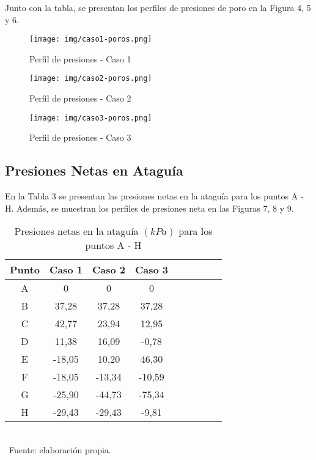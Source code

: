 \documentclass{article} %
\begin{document}
Junto con la tabla, se presentan los perfiles de presiones de poro en la Figura 4, 5 y 6.

\begin{figure}[h!]
    \centering
    \begin{minipage}{0.5\textwidth}
        \centering
        \texttt{[image: img/caso1-poros.png]}
        \caption{Perfil de presiones - Caso 1}
        \label{fig:imagen4}
    \end{minipage}\hfill
    \begin{minipage}{0.5\textwidth}
        \centering
        \texttt{[image: img/caso2-poros.png]}
        \caption{Perfil de presiones - Caso 2}
        \label{fig:imagen5}
    \end{minipage}\hfill
\end{figure}

\begin{figure}[h!]
    \centering
    \begin{minipage}{0.5\textwidth}
        \centering
        \texttt{[image: img/caso3-poros.png]}
        \caption{Perfil de presiones - Caso 3}
        \label{fig:imagen6}
    \end{minipage}
\end{figure}

\vspace{2cm}

\subsection{Presiones Netas en Ataguía}

En la Tabla 3 se presentan las presiones netas en la ataguía para los puntos A - H. Además, se muestran los perfiles de presiones neta en las Figuras 7, 8 y 9.

\begin{table}[h!]
    \centering
    \caption{Presiones netas en la ataguía $(kPa)$ para los puntos A - H}
    \begin{tabular}{|c|c|c|c|c|c|c|c|c|}
      \hline
      Punto & Caso 1 & Caso 2 & Caso 3 \\
      \hline
      A & 0 & 0 & 0 \\
      \hline
      B & 37,28 & 37,28 & 37,28 \\
      \hline
      C & 42,77 & 23,94 & 12,95 \\
      \hline
      D & 11,38 & 16,09 & -0,78 \\
      \hline
      E & -18,05 & 10,20 & 46,30 \\
      \hline
      F & -18,05 & -13,34 & -10,59 \\
      \hline
      G & -25,90 & -44,73 & -75,34 \\
      \hline
      H & -29,43 & -29,43 & -9,81 \\
      \hline
    \end{tabular}
    \footnotesize \\\ Fuente: elaboración propia.
    \label{tab3}
\end{table}
\end{document}
